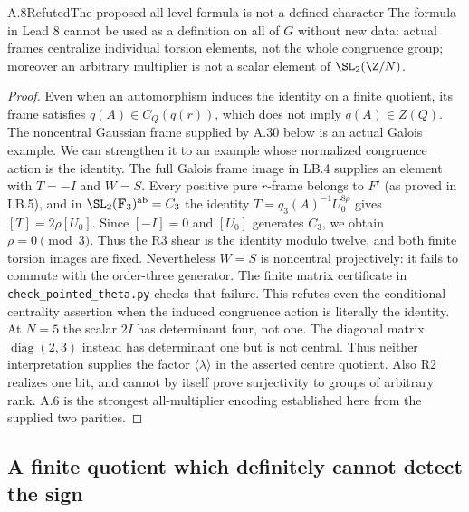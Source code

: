 \begin{statement}{A.8}{Refuted}{The proposed all-level formula is not a defined character}
The formula in Lead 8 cannot be used as a definition on all of
$G$ without new data: actual frames centralize individual torsion
elements, not the whole congruence group; moreover an arbitrary
multiplier is not a scalar element of $\SL_2(\Z/N)$.
\end{statement}
\begin{proof}
Even when an automorphism induces the identity on a finite
quotient, its frame satisfies $q(A)\in C_Q(q(r))$, which does
not imply $q(A)\in Z(Q)$. The noncentral Gaussian frame supplied
by A.30 below is an actual Galois example. We can strengthen it
to an example whose normalized congruence action is the identity.
The full Galois frame image in LB.4 supplies an element with
$T=-I$ and $W=S$. Every positive pure $r$-frame belongs to $F'$
(as proved in LB.5), and in $\SL_2(\mathbf F_3)^{\rm ab}=C_3$
the identity $T=q_3(A)^{-1}U_0^{8\rho}$ gives
$[T]=2\rho[U_0]$. Since $[-I]=0$ and $[U_0]$ generates $C_3$,
we obtain $\rho=0\pmod3$. Thus the R3 shear is the identity
modulo twelve, and both finite torsion images are fixed.
Nevertheless $W=S$ is noncentral projectively: it fails to commute
with the order-three generator. The finite matrix certificate
in \texttt{check\_pointed\_theta.py} checks that failure.
This refutes even the conditional centrality assertion when the
induced congruence action is literally the identity.
At $N=5$ the scalar
$2I$ has determinant four, not one. The diagonal matrix
$\operatorname{diag}(2,3)$ instead has determinant one but is
not central. Thus neither interpretation supplies the factor
$\langle\lambda\rangle$ in the asserted centre quotient. Also
R2 realizes one bit, and cannot by itself prove surjectivity to
groups of arbitrary rank. A.6 is the strongest all-multiplier
encoding established here from the supplied two parities.
\end{proof}

\subsection{A finite quotient which definitely cannot detect the sign}

